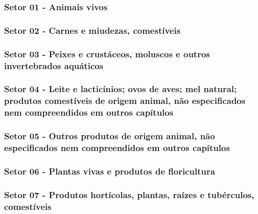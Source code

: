 \subsubsection{Setor 01 - Animais vivos}

 

\subsubsection{Setor 02 - Carnes e miudezas, comestíveis}

 
\subsubsection{Setor 03 - Peixes e crustáceos, moluscos e outros invertebrados aquáticos}

 

\subsubsection{Setor 04 - Leite e lacticínios; ovos de aves; mel natural; produtos comestíveis de origem animal, não especificados nem compreendidos em outros capítulos}

 
\subsubsection{Setor 05 - Outros produtos de origem animal, não especificados nem compreendidos em outros capítulos}

 

\subsubsection{Setor 06 - Plantas vivas e produtos de floricultura}


 
\subsubsection{Setor 07 - Produtos hortícolas, plantas, raízes e tubérculos, comestíveis}

 

